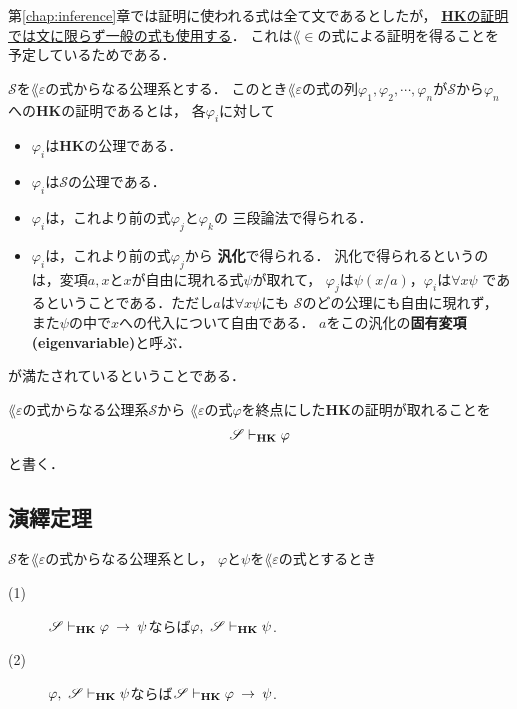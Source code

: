 	第\ref{chap:inference}章では証明に使われる式は全て文であるとしたが，
	\underline{{\bf HK}の証明では文に限らず一般の式も使用する}．
	これは$\lang{\in}$の式による証明を得ることを予定しているためである．
	
	\begin{screen}
		\begin{metadfn}[{\bf HK}における証明]
			$\mathscr{S}$を$\lang{\varepsilon}$の式からなる公理系とする．
			このとき$\lang{\varepsilon}$の式の列$\varphi_{1},\varphi_{2},\cdots,
			\varphi_{n}$が$\mathscr{S}$から$\varphi_{n}$への{\bf HK}の証明であるとは，
			各$\varphi_{i}$に対して
			\begin{itemize}
				\item $\varphi_{i}$は{\bf HK}の公理である．
				\item $\varphi_{i}$は$\mathscr{S}$の公理である．
				\item $\varphi_{i}$は，これより前の式$\varphi_{j}$と$\varphi_{k}$の
					三段論法で得られる．
				\item $\varphi_{i}$は，これより前の式$\varphi_{j}$から
					{\bf 汎化}で得られる．
					汎化で得られるというのは，変項$a,x$と$x$が自由に現れる式$\psi$が取れて，
					$\varphi_{j}$は$\psi(x/a)$，$\varphi_{i}$は$\forall x \psi$
					であるということである．ただし$a$は$\forall x \psi$にも
					$\mathscr{S}$のどの公理にも自由に現れず，
					また$\psi$の中で$x$への代入について自由である．
					$a$をこの汎化の{\bf 固有変項}
					{\bf (eigenvariable)}と呼ぶ．
			\end{itemize}
			が満たされているということである．
		\end{metadfn}
	\end{screen}
	
	$\lang{\varepsilon}$の式からなる公理系$\mathscr{S}$から
	$\lang{\varepsilon}$の式$\varphi$を終点にした{\bf HK}の証明が取れることを
	\begin{align}
		\mathscr{S} \vdash_{{\scriptsize \mbox{{\bf HK}}}} \varphi
	\end{align}
	と書く．
	
\subsection{演繹定理}
	\begin{screen}
		\begin{metathm}[{\bf HK}の演繹定理]
		\label{metathm:deduction_theorem_of_HK}
			$\mathscr{S}$を$\lang{\varepsilon}$の式からなる公理系とし，
			$\varphi$と$\psi$を$\lang{\varepsilon}$の式とするとき
			\begin{description}
				\item[(1)] $\mathscr{S} \vdash_{{\scriptsize \mbox{{\bf HK}}}} \varphi \hspace{0.25em}\rightarrow\hspace{0.25em} \psi$ならば$\varphi,\ \mathscr{S} \provable{\mbox{{\bf HK}}} \psi$.
				\item[(2)] $\varphi,\ \mathscr{S} \provable{\mbox{{\bf HK}}} \psi$ならば$\mathscr{S} \vdash_{{\scriptsize \mbox{{\bf HK}}}} \varphi \hspace{0.25em}\rightarrow\hspace{0.25em} \psi$.
			\end{description}
		\end{metathm}
	\end{screen}
	
